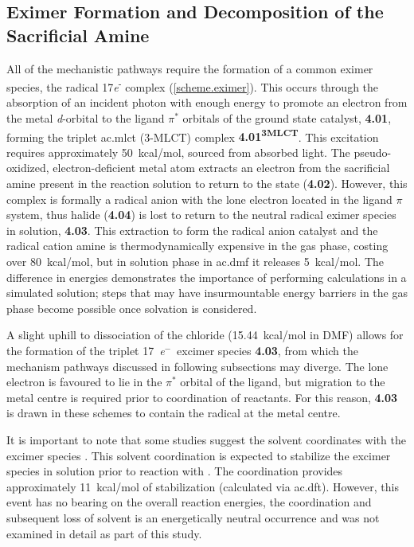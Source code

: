 \subsection{Eximer Formation and Decomposition of the Sacrificial Amine}\label{ss.initiation}

All of the mechanistic pathways require the formation of a common eximer species, the radical 17\textit{e}\textsuperscript{-} complex (\autoref{scheme.eximer}). This occurs through the absorption of an incident photon with enough energy to promote an electron from the metal \textit{d}-orbital to the ligand $\pi^\ast$ orbitals of the ground state catalyst, \textbf{4.01}, forming the triplet \acrlong{ac.mlct} (3-MLCT) complex \textbf{4.01\textsuperscript{3MLCT}}. This excitation requires approximately 50~kcal/mol, sourced from absorbed light. The pseudo-oxidized, electron-deficient metal atom extracts an electron from the sacrificial amine present in the reaction solution to return to the  state (\textbf{4.02}). However, this complex is formally a radical anion with the lone electron located in the ligand $\pi$ system, thus halide (\textbf{4.04}) is lost to return to the neutral radical eximer species in solution, \textbf{4.03}. This extraction to form the radical anion catalyst and the radical cation amine is thermodynamically expensive in the gas phase, costing over 80~kcal/mol, but in solution phase in \gls{ac.dmf} it releases 5~kcal/mol. The difference in energies demonstrates the importance of performing calculations in a simulated solution; steps that may have insurmountable energy barriers in the gas phase become possible once solvation is considered.

A slight uphill to dissociation of the chloride (15.44~kcal/mol in DMF) allows for the formation of the triplet 17~\textit{e}$^-$~excimer species \textbf{4.03}, from which the  mechanism pathways discussed in following subsections may diverge. The lone electron is favoured to lie in the $\pi^\ast$ orbital of the ligand, but migration to the metal centre is required prior to coordination of reactants\autocite{hayashi2003}. For this reason, \textbf{4.03} is drawn in these schemes to contain the radical at the metal centre.

It is important to note that some studies suggest the solvent coordinates with the excimer species \autocite{morris2009, kou2014}. This solvent coordination is expected to stabilize the excimer species in solution prior to reaction with \autocite{fujita2004}. The coordination provides approximately 11~kcal/mol of stabilization (calculated via \gls{ac.dft}). However, this event has no bearing on the overall reaction energies, the coordination and subsequent loss of solvent is an energetically neutral occurrence and was not examined in detail as part of this study.

